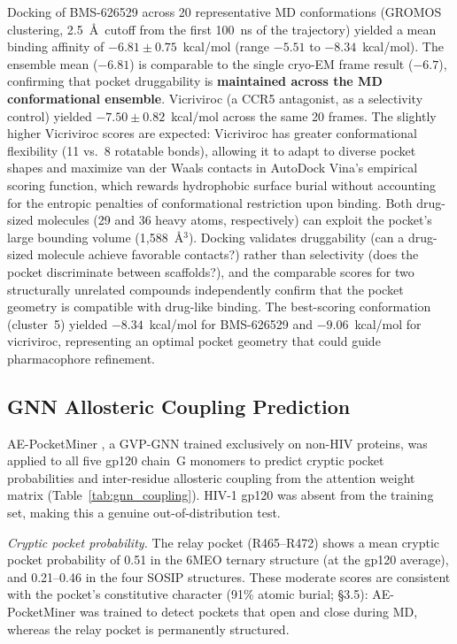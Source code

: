 \documentclass[11pt,a4paper]{article}
\begin{document}
Docking of BMS-626529 across 20 representative MD conformations (GROMOS clustering, 2.5~\AA\ cutoff from the first 100~ns of the trajectory) yielded a mean binding affinity of $-6.81 \pm 0.75$~kcal/mol (range $-5.51$ to $-8.34$~kcal/mol). The ensemble mean ($-6.81$) is comparable to the single cryo-EM frame result ($-6.7$), confirming that pocket druggability is \textbf{maintained across the MD conformational ensemble}. Vicriviroc (a CCR5 antagonist, as a selectivity control) yielded $-7.50 \pm 0.82$~kcal/mol across the same 20 frames. The slightly higher Vicriviroc scores are expected: Vicriviroc has greater conformational flexibility (11 vs.\ 8 rotatable bonds), allowing it to adapt to diverse pocket shapes and maximize van der Waals contacts in AutoDock Vina's empirical scoring function, which rewards hydrophobic surface burial without accounting for the entropic penalties of conformational restriction upon binding. Both drug-sized molecules (29 and 36 heavy atoms, respectively) can exploit the pocket's large bounding volume (1,588~\AA$^3$). Docking validates druggability (can a drug-sized molecule achieve favorable contacts?) rather than selectivity (does the pocket discriminate between scaffolds?), and the comparable scores for two structurally unrelated compounds independently confirm that the pocket geometry is compatible with drug-like binding. The best-scoring conformation (cluster~5) yielded $-8.34$~kcal/mol for BMS-626529 and $-9.06$~kcal/mol for vicriviroc, representing an optimal pocket geometry that could guide pharmacophore refinement.

\subsection{GNN Allosteric Coupling Prediction}

AE-PocketMiner \citep{Zhang2026AEPocketMiner}, a GVP-GNN trained exclusively on non-HIV proteins, was applied to all five gp120 chain~G monomers to predict cryptic pocket probabilities and inter-residue allosteric coupling from the attention weight matrix (Table~\ref{tab:gnn_coupling}). HIV-1 gp120 was absent from the training set, making this a genuine out-of-distribution test.

\textit{Cryptic pocket probability.} The relay pocket (R465--R472) shows a mean cryptic pocket probability of 0.51 in the 6MEO ternary structure (at the gp120 average), and 0.21--0.46 in the four SOSIP structures. These moderate scores are consistent with the pocket's constitutive character (91\% atomic burial; \S3.5): AE-PocketMiner was trained to detect pockets that open and close during MD, whereas the relay pocket is permanently structured.
\end{document}
